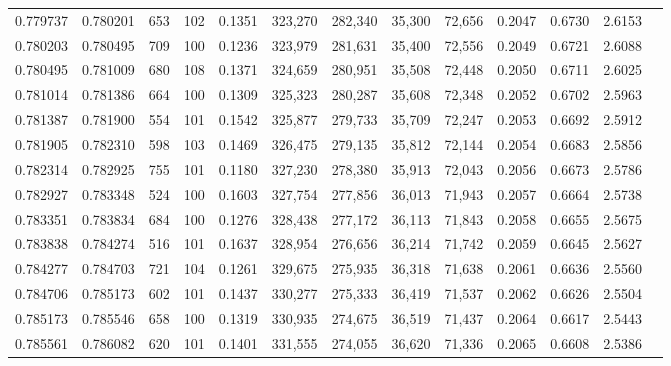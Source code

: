\begin{tabular}{rrrrrrrrrrrrr}
0.779737 & 0.780201 &   653 & 102 &                                     0.1351 & 323,270 & 282,340 &  35,300 &  72,656 & 0.2047 & 0.6730 & 2.6153 \\
0.780203 & 0.780495 &   709 & 100 &                                     0.1236 & 323,979 & 281,631 &  35,400 &  72,556 & 0.2049 & 0.6721 & 2.6088 \\
0.780495 & 0.781009 &   680 & 108 &                                     0.1371 & 324,659 & 280,951 &  35,508 &  72,448 & 0.2050 & 0.6711 & 2.6025 \\
0.781014 & 0.781386 &   664 & 100 &                                     0.1309 & 325,323 & 280,287 &  35,608 &  72,348 & 0.2052 & 0.6702 & 2.5963 \\
0.781387 & 0.781900 &   554 & 101 &                                     0.1542 & 325,877 & 279,733 &  35,709 &  72,247 & 0.2053 & 0.6692 & 2.5912 \\
0.781905 & 0.782310 &   598 & 103 &                                     0.1469 & 326,475 & 279,135 &  35,812 &  72,144 & 0.2054 & 0.6683 & 2.5856 \\
0.782314 & 0.782925 &   755 & 101 &                                     0.1180 & 327,230 & 278,380 &  35,913 &  72,043 & 0.2056 & 0.6673 & 2.5786 \\
0.782927 & 0.783348 &   524 & 100 &                                     0.1603 & 327,754 & 277,856 &  36,013 &  71,943 & 0.2057 & 0.6664 & 2.5738 \\
0.783351 & 0.783834 &   684 & 100 &                                     0.1276 & 328,438 & 277,172 &  36,113 &  71,843 & 0.2058 & 0.6655 & 2.5675 \\
0.783838 & 0.784274 &   516 & 101 &                                     0.1637 & 328,954 & 276,656 &  36,214 &  71,742 & 0.2059 & 0.6645 & 2.5627 \\
0.784277 & 0.784703 &   721 & 104 &                                     0.1261 & 329,675 & 275,935 &  36,318 &  71,638 & 0.2061 & 0.6636 & 2.5560 \\
0.784706 & 0.785173 &   602 & 101 &                                     0.1437 & 330,277 & 275,333 &  36,419 &  71,537 & 0.2062 & 0.6626 & 2.5504 \\
0.785173 & 0.785546 &   658 & 100 &                                     0.1319 & 330,935 & 274,675 &  36,519 &  71,437 & 0.2064 & 0.6617 & 2.5443 \\
0.785561 & 0.786082 &   620 & 101 &                                     0.1401 & 331,555 & 274,055 &  36,620 &  71,336 & 0.2065 & 0.6608 & 2.5386 \\

\end{tabular}
